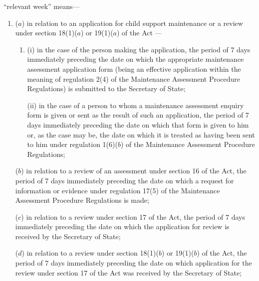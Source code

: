 \documentclass[a4paper]{article}
\begin{document}
\begin{enumerate}
“relevant week” means---
\begin{enumerate}\item[]
($a$) in relation to an application for child support maintenance
or a review under section 18(1)($a$) or 19(1)($a$) of the Act%
---
\begin{enumerate}\item[]
(i) in the case of the person making the application, the period of 7 days immediately preceding the date on which the appropriate maintenance assessment application form (being an effective application within the meaning of regulation 2(4) of the Maintenance Assessment Procedure Regulations) is submitted to the Secretary of State;

(ii) in the case of a person to whom a maintenance assessment enquiry form is given or sent as the result of such an application, the period of 7 days immediately preceding the date on which that form is given to him or, as the case may be, the date on which it is treated as having been sent to him under regulation 1(6)($b$) of the Maintenance Assessment Procedure Regulations;
\end{enumerate}


($b$) in relation to a review of an assessment under section 16 of the Act, the period of 7 days immediately preceding the date on which a request for information or evidence under regulation 17(5) of the Maintenance Assessment Procedure Regulations is made;

($c$) in relation to a review under section 17 of the Act, the period of 7 days immediately preceding the date on which the application for review is received by the Secretary of State;

($d$) in relation to a review under section 18(1)($b$) or 19(1)($b$) of the Act, the period of 7 days immediately preceding the date on which application for the review under section 17 of the Act was received by the Secretary of State;


\end{enumerate}
\end{enumerate}
\end{document}
